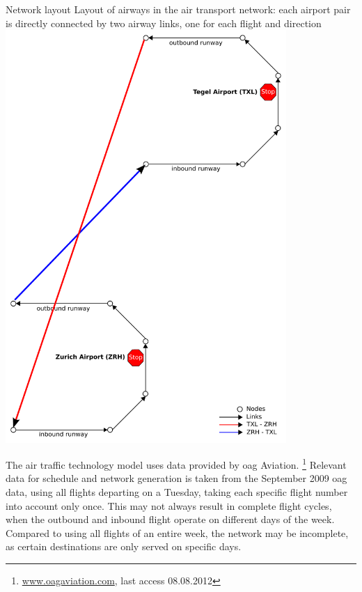 {\citet{GretherFuerbasNagel2013FlightTechnologyPROCEDIA}}
%
%
\createfigure%
{Network layout}%
{Layout of airways in the air transport network: each airport pair is directly connected by two airway links, one for each flight and direction}%
{\label{fig:air_network_model}}
{\includegraphics[width=0.8\textwidth]{scenarios/figures/sf_airport_network_no_slide.pdf}}%
{\citet{GretherFuerbasNagel2013FlightTechnologyPROCEDIA}}

The air traffic technology model uses data provided by \gls{oag} Aviation.%
\footnote{\url{www.oagaviation.com}, last access 08.08.2012}
Relevant data for schedule and network generation is taken from the September 2009 \gls{oag} data, using all flights departing on a Tuesday, taking each specific flight number into account only once.
This may not always result in complete flight cycles, \eg when the outbound and inbound flight operate on different days of the week. 
Compared to using all flights of an entire week, the network may be incomplete, as certain destinations are only served on specific days.

